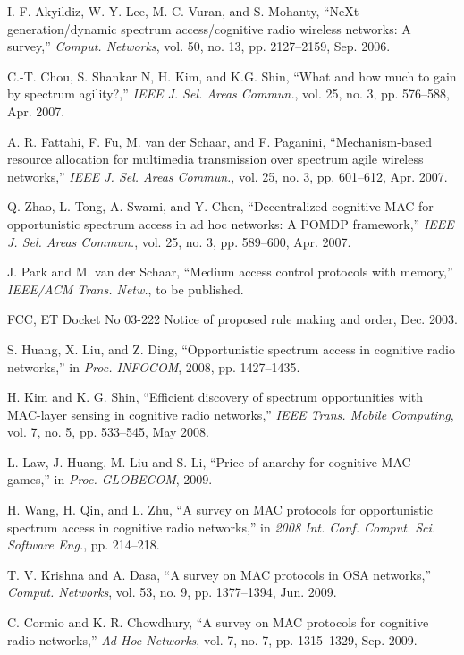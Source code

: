 \documentclass[12pt,draftclsnofoot,onecolumn]{IEEEtran}
\begin{document}
\begin{thebibliography}{99}

 I. F. Akyildiz, W.-Y. Lee, M. C. Vuran, and S. Mohanty, ``NeXt generation/dynamic spectrum access/cognitive
radio wireless networks: A survey,'' \emph{Comput. Networks}, vol. 50, no. 13, pp. 2127--2159, Sep. 2006.

 C.-T. Chou, S. Shankar N, H. Kim, and K.G. Shin, ``What and how much to gain
by spectrum agility?,'' \emph{IEEE J. Sel. Areas Commun.}, vol. 25, no. 3, pp. 576--588, Apr. 2007.

 A. R. Fattahi, F. Fu, M. van der Schaar, and F. Paganini, ``Mechanism-based resource
allocation for multimedia transmission over spectrum agile wireless networks,''
\emph{IEEE J. Sel. Areas Commun.}, vol. 25, no. 3, pp. 601--612, Apr. 2007.

 Q. Zhao, L. Tong, A. Swami, and Y. Chen, ``Decentralized cognitive MAC
for opportunistic spectrum access in ad hoc networks: A POMDP framework,''
\emph{IEEE J. Sel. Areas Commun.}, vol. 25, no. 3, pp. 589--600, Apr. 2007.

 J. Park and M. van der Schaar, ``Medium access control protocols with memory,''
\emph{IEEE/ACM Trans. Netw.}, to be published.

 FCC, ET Docket No 03-222 Notice of proposed rule making and order, Dec. 2003.

 S. Huang, X. Liu, and Z. Ding, ``Opportunistic spectrum access in
cognitive radio networks,'' in \emph{Proc. INFOCOM}, 2008, pp. 1427--1435.

 H. Kim and K. G. Shin, ``Efficient discovery of spectrum opportunities
with MAC-layer sensing in cognitive radio networks,'' \emph{IEEE
Trans. Mobile Computing}, vol. 7, no. 5, pp. 533--545, May 2008.

 L. Law, J. Huang, M. Liu and S. Li, ``Price of anarchy for cognitive
MAC games,'' in \emph{Proc. GLOBECOM}, 2009.

 H. Wang, H. Qin, and L. Zhu, ``A survey on MAC protocols for
opportunistic spectrum access in cognitive radio networks,'' in \emph{2008 Int. Conf. Comput.
Sci. Software Eng.}, pp. 214--218.

 T. V. Krishna and A. Dasa, ``A survey on MAC protocols in OSA networks,''
\emph{Comput. Networks}, vol. 53, no. 9, pp. 1377--1394, Jun. 2009.

 C. Cormio and K. R. Chowdhury, ``A survey on MAC protocols
for cognitive radio networks,'' \emph{Ad Hoc Networks}, vol. 7, no. 7, pp.
1315--1329, Sep. 2009.


\end{thebibliography}
\end{document}

